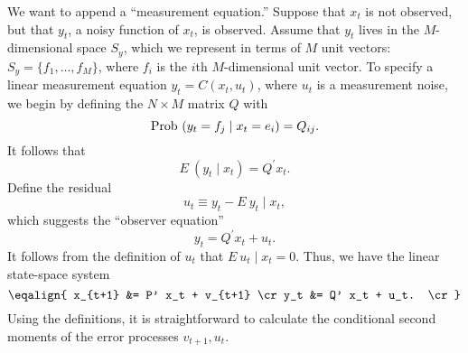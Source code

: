   We want to append a ``measurement equation.''   %
Suppose that $x_t$ is not observed, but that $y_t$, a   noisy function
of $x_t$, is observed.  Assume that $y_t$ lives in the $M$-dimensional
space $S_y$, which we represent in terms of
$M$ unit  vectors:
$S_y = \{f_1,\ldots, f_M\}$, where $f_i$ is the $i$th $M$-dimensional
unit vector.
To specify a  linear measurement equation $y_t = C(x_t, u_t)$, where
$u_t$ is a measurement noise, we begin by defining the $N \times M$
matrix $Q$ with
$$\hbox{Prob } (y_t = f_j \mid x_t = e_i) = Q_{ij}.$$
It follows that
 $$E\ (y_t\mid x_t) = Q^\prime x_t.$$
Define the residual
$$u_t \equiv y_t - E\ y_t\mid x_t,$$
which suggests the ``observer equation''  
$$y_t = Q^\prime x_t + u_t.$$
It follows from the definition of $u_t$ that $E \ u_t \mid x_t = 0$.
Thus, we have the linear state-space system
$$\eqalign{ x_{t+1} &= P' x_t + v_{t+1} \cr
             y_t &= Q' x_t + u_t. \cr}  $$
Using the definitions,
it is straightforward to calculate the conditional second moments
of the error processes
 $v_{t+1},u_t$.



